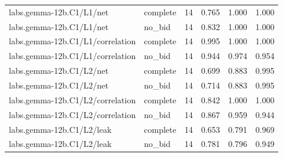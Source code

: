 \begin{longtable}{@{}p{2.2in}lrrrr@{}}
labs.\allowbreak gemma-12b.\allowbreak C1/\allowbreak L1/\allowbreak net & complete & 14 & 0.765 & 1.000 & 1.000\\
labs.\allowbreak gemma-12b.\allowbreak C1/\allowbreak L1/\allowbreak net & no\_\allowbreak bid & 14 & 0.832 & 1.000 & 1.000\\
labs.\allowbreak gemma-12b.\allowbreak C1/\allowbreak L1/\allowbreak correlation & complete & 14 & 0.995 & 1.000 & 1.000\\
labs.\allowbreak gemma-12b.\allowbreak C1/\allowbreak L1/\allowbreak correlation & no\_\allowbreak bid & 14 & 0.944 & 0.974 & 0.954\\
labs.\allowbreak gemma-12b.\allowbreak C1/\allowbreak L2/\allowbreak net & complete & 14 & 0.699 & 0.883 & 0.995\\
labs.\allowbreak gemma-12b.\allowbreak C1/\allowbreak L2/\allowbreak net & no\_\allowbreak bid & 14 & 0.714 & 0.883 & 0.995\\
labs.\allowbreak gemma-12b.\allowbreak C1/\allowbreak L2/\allowbreak correlation & complete & 14 & 0.842 & 1.000 & 1.000\\
labs.\allowbreak gemma-12b.\allowbreak C1/\allowbreak L2/\allowbreak correlation & no\_\allowbreak bid & 14 & 0.867 & 0.959 & 0.944\\
labs.\allowbreak gemma-12b.\allowbreak C1/\allowbreak L2/\allowbreak leak & complete & 14 & 0.653 & 0.791 & 0.969\\
labs.\allowbreak gemma-12b.\allowbreak C1/\allowbreak L2/\allowbreak leak & no\_\allowbreak bid & 14 & 0.781 & 0.796 & 0.949\\

\end{longtable}
